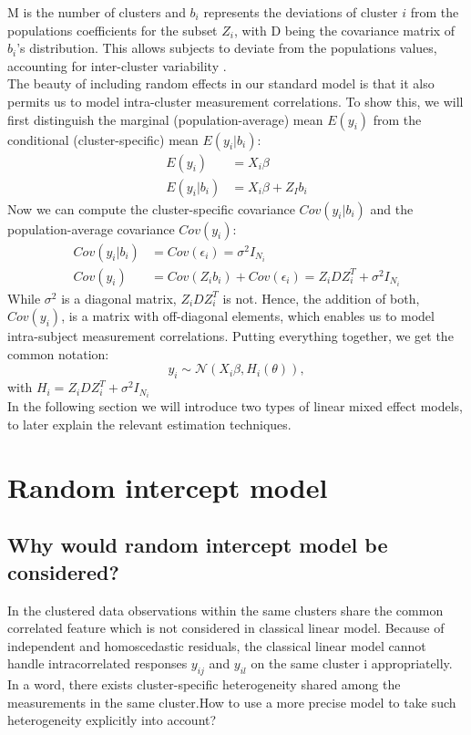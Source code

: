 \documentclass[a4paper,11pt]{article}
\begin{document}
M is the number of clusters and $b_i$ represents the deviations of cluster $i$ from the populations coefficients for the subset $Z_i$, with D being the covariance matrix of $b_i$’s distribution. This allows subjects to deviate from the populations values, accounting for inter-cluster variability \cite{Tutorial}.\\
The beauty of including random effects in our standard model is that it also permits us to model intra-cluster measurement correlations. To show this, we will first distinguish the marginal (population-average) mean $E(y_i)$ from the conditional (cluster-specific) mean $E(y_i|b_i)$:
\begin{align*}
		E(y_i)&=X_i\beta\\
		E(y_i|b_i)&=X_i\beta+Z_Ib_i
\end{align*}
Now we can compute the cluster-specific covariance $Cov(y_i|b_i)$ and the population-average covariance $Cov(y_i)$:
\begin{align*}
	Cov(y_i|b_i)&=Cov(\epsilon_i)=\sigma^2I_{N_i}\\
	Cov(y_i)&=Cov(Z_ib_i)+Cov(\epsilon_i)=Z_iDZ_i^T+\sigma^2I_{N_i}
\end{align*}
While $\sigma^2$ is a diagonal matrix, $Z_iDZ_i^T$ is not. Hence, the addition of both, $Cov(y_i)$, is a matrix with off-diagonal elements, which enables us to model intra-subject measurement correlations.
Putting everything together, we get the common notation:
\begin{equation}\label{xy}
	y_i \sim\mathcal{N}(X_i\beta,H_i(\theta)),
\end{equation}
with $H_i=Z_iDZ_i^T + \sigma^2I_{N_i}$\\
 In the following section we will introduce two types of linear mixed effect models, to later explain the relevant estimation techniques. 
 





\section{Random intercept model}

\subsection{Why would random intercept model be considered?}
In the clustered data observations within the same clusters share the common correlated feature which is not considered in classical linear model.
Because of independent and homoscedastic residuals, the classical linear model cannot handle intracorrelated responses $y_{ij}$ and $y_{il}$ on the same cluster i appropriatelly. In a word, there exists cluster-specific heterogeneity shared among the measurements in the same cluster.How to use a more precise model to take such heterogeneity explicitly into account? 
\end{document}
